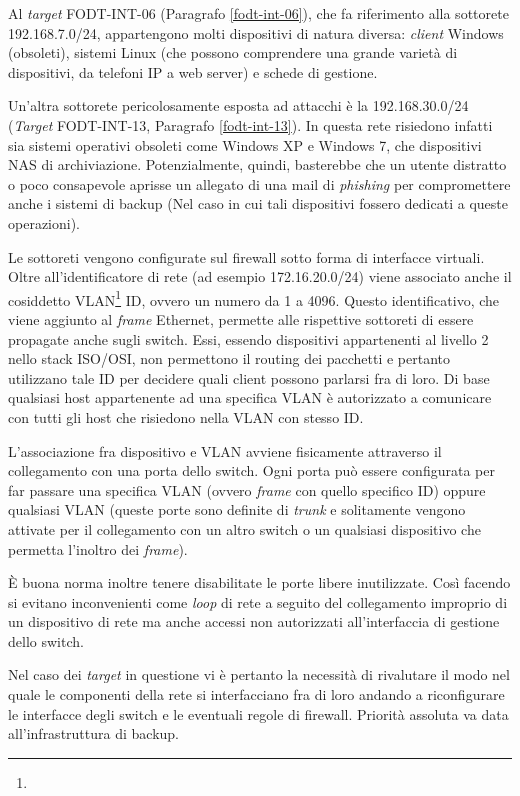 \documentclass[target=bach,aauheader=]{thud}
\begin{document}
Al \textit{target} FODT-INT-06 (Paragrafo \ref{fodt-int-06}), che fa riferimento alla sottorete 192.168.7.0/24, appartengono molti dispositivi di natura diversa: \textit{client} Windows (obsoleti), sistemi Linux (che possono comprendere una grande varietà di dispositivi, da telefoni IP a web server) e schede di gestione.

Un'altra sottorete pericolosamente esposta ad attacchi è la 192.168.30.0/24 (\textit{Target} FODT-INT-13, Paragrafo \ref{fodt-int-13}). In questa rete risiedono infatti sia sistemi operativi obsoleti come Windows XP e Windows 7, che dispositivi NAS di archiviazione. Potenzialmente, quindi, basterebbe che un utente distratto o poco consapevole aprisse un allegato di una mail di \textit{phishing} per compromettere anche i sistemi di backup (Nel caso in cui tali dispositivi fossero dedicati a queste operazioni).

Le sottoreti vengono configurate sul firewall sotto forma di interfacce virtuali. Oltre all'identificatore di rete (ad esempio 172.16.20.0/24) viene associato anche il cosiddetto VLAN\footnote{} ID, ovvero un numero da 1 a 4096. Questo identificativo, che viene aggiunto al \textit{frame} Ethernet, permette alle rispettive sottoreti di essere propagate anche sugli switch. Essi, essendo dispositivi appartenenti al livello 2 nello stack ISO/OSI, non permettono il routing dei pacchetti e pertanto utilizzano tale ID per decidere quali client possono parlarsi fra di loro. Di base qualsiasi host appartenente ad una specifica VLAN è autorizzato a comunicare con tutti gli host che risiedono nella VLAN con stesso ID.

L'associazione fra dispositivo e VLAN avviene fisicamente attraverso il collegamento con una porta dello switch. Ogni porta può essere configurata per far passare una specifica VLAN (ovvero \textit{frame} con quello specifico ID) oppure qualsiasi VLAN (queste porte sono definite di \textit{trunk} e solitamente vengono attivate per il collegamento con un altro switch o un qualsiasi dispositivo che permetta l'inoltro dei \textit{frame}).

È buona norma inoltre tenere disabilitate le porte libere inutilizzate. Così facendo si evitano inconvenienti come \textit{loop} di rete a seguito del collegamento improprio di un dispositivo di rete ma anche accessi non autorizzati all'interfaccia di gestione dello switch. 

Nel caso dei \textit{target} in questione vi è pertanto la necessità di rivalutare il modo nel quale le componenti della rete si interfacciano fra di loro andando a riconfigurare le interfacce degli switch e le eventuali regole di firewall. Priorità assoluta va data all'infrastruttura di backup.
\end{document}

